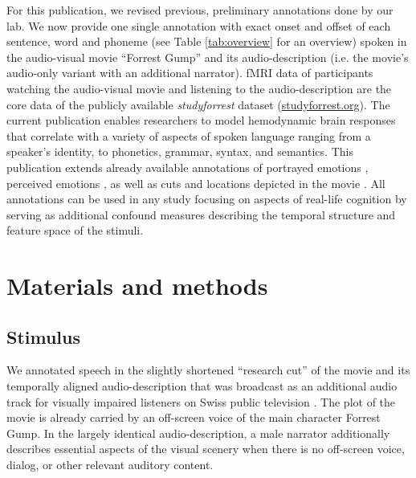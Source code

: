 \documentclass[10pt,a4paper,onecolumn]{article}
\begin{document}
For this publication, we revised previous, preliminary annotations done by our
lab.
We now provide one single annotation with exact onset and offset of each
sentence, word and phoneme (see Table \ref{tab:overview} for an overview) spoken
in the audio-visual movie ``Forrest Gump'' \citep{ForrestGumpMovie} and its
audio-description (i.e. the movie's audio-only variant with an additional
narrator)\citep{ForrestGumpGermanAD}.
fMRI data of participants watching the audio-visual movie
\citep{hanke2016simultaneous} and listening to the audio-description
\citep{hanke2014audiomovie} are the core data of the publicly available
\textit{studyforrest} dataset (\href{www.studyforrest.org}{studyforrest.org}).
The current publication enables researchers to model hemodynamic brain responses
that correlate with a variety of aspects of spoken language ranging from a
speaker's identity, to phonetics, grammar, syntax, and semantics.
This publication extends already available annotations of portrayed emotions
\citep{labs2015portrayed}, perceived emotions \citep{lettieri2019emotionotopy},
as well as cuts and locations depicted in the movie
\citep{haeusler2016annotation}.
All annotations can be used in any study focusing on aspects of real-life
cognition by serving as additional confound measures describing the  temporal
structure and feature space of the stimuli.


\section*{Materials and methods}

\subsection*{Stimulus}
We annotated speech in the slightly shortened ``research cut''
\citep{hanke2014audiomovie} of the movie and its
temporally aligned audio-description \citep{hanke2016simultaneous} that was broadcast as an additional audio
track for visually impaired listeners on Swiss public television
\citep{ForrestGumpGermanAD}.
The plot of the movie is already carried by an off-screen voice of the main
character Forrest Gump. In the largely identical audio-description, a male
narrator additionally describes essential aspects of the visual scenery when
there is no off-screen voice, dialog, or other relevant auditory content.
\end{document}
